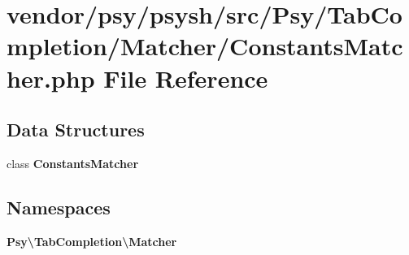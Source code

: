 \section{vendor/psy/psysh/src/\+Psy/\+Tab\+Completion/\+Matcher/\+Constants\+Matcher.php File Reference}
\label{_constants_matcher_8php}
\subsection*{Data Structures}
\begin{DoxyCompactItemize}
\item 
class {\bf Constants\+Matcher}
\end{DoxyCompactItemize}
\subsection*{Namespaces}
\begin{DoxyCompactItemize}
\item 
 {\bf Psy\textbackslash{}\+Tab\+Completion\textbackslash{}\+Matcher}
\end{DoxyCompactItemize}
